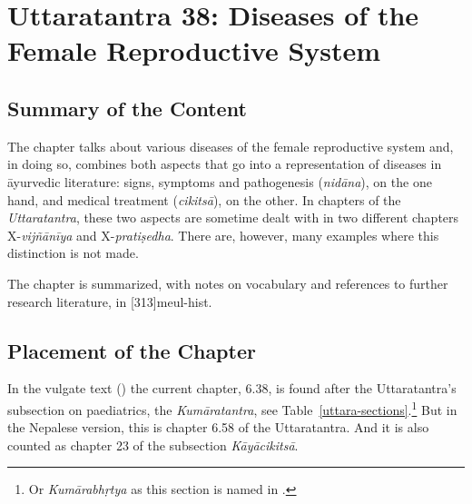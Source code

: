 
\chapter{Uttaratantra 38: Diseases of the Female Reproductive System}



\section{Summary of the Content} 

The chapter talks about various diseases of the female reproductive
system and, in doing so, combines both aspects that go into a
representation of diseases in āyurvedic literature: signs, symptoms and
pathogenesis (\emph{nidāna}), on the one hand, and medical treatment
(\emph{cikitsā}), on the other. In chapters of the \emph{Uttaratantra},
these two aspects are sometime dealt with in two different chapters
X-\emph{vijñānīya} and X-\emph{pratiṣedha}. There are, however, many
examples where this distinction is not made.

The chapter is summarized, with notes on vocabulary and references to
further research literature, in [313]{meul-hist}.

\section{Placement of the Chapter}

In the vulgate text (\cite{vulgate}) the current chapter, 6.38, is found
after the Uttaratantra's subsection on paediatrics, the
\emph{Kumāratantra}, see Table~\ref{uttara-sections}.\footnote{Or 
\emph{Kumārabhṛtya} as this section is
    named in .}  But in the Nepalese version, this
    is chapter 6.58 of the Uttaratantra. And it is also counted as chapter 23
    of the subsection \emph{Kāyācikitsā}.

